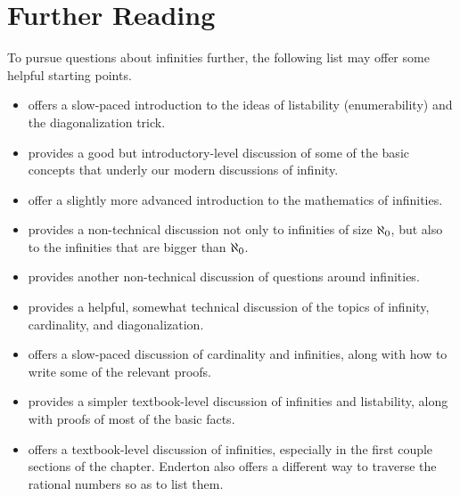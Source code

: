 \documentclass[../../../main.tex]{subfiles}
\begin{document}
\chapter{Further Reading}

To pursue questions about infinities further, the following list may offer some helpful starting points.

\begin{itemize}

  \item \citet[chs.~1--2]{BoolosBurgessAndJeffrey2002} offers a slow-paced introduction to the ideas of listability (enumerability) and the diagonalization trick.

  \item \citet[ch.~9]{Stewart1995} provides a good but introductory-level discussion of some of the basic concepts that underly our modern discussions of infinity.
  
  \item \citet[ch.~14]{StewartAndTall2015} offer a slightly more advanced introduction to the mathematics of infinities.
  
  \item \citet[ch.~9]{Steinhart2018} provides a non-technical discussion not only to infinities of size $\AlephZero/$, but also to the infinities that are bigger than $\AlephZero/$.
  
  \item \citet[ch.~4]{Wilder2012} provides another non-technical discussion of questions around infinities.
  
  \item \citet[ch.~4]{Zach2019} provides a helpful, somewhat technical discussion of the topics of infinity, cardinality, and diagonalization.
  
  \item \citet[ch.~2]{Cummings2018} offers a slow-paced discussion of cardinality and infinities, along with how to write some of the relevant proofs.
  
  \item \cite[ch.~7]{Pinter2014} provides a simpler textbook-level discussion of infinities and listability, along with proofs of most of the basic facts.
  
  \item \cite[ch.~6]{Enderton1977} offers a textbook-level discussion of infinities, especially in the first couple sections of the chapter. Enderton also offers a different way to traverse the rational numbers so as to list them.
  
\end{itemize}
\end{document}
